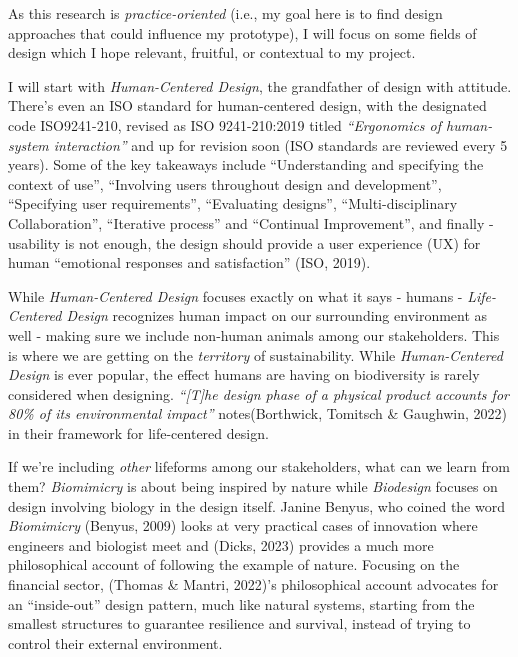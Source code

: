 \documentclass[
  letterpaper,
  DIV=11,
  numbers=noendperiod]{scrartcl}
\begin{document}
As this research is \emph{practice-oriented} (i.e., my goal here is to
find design approaches that could influence my prototype), I will focus
on some fields of design which I hope relevant, fruitful, or contextual
to my project.

I will start with \emph{Human-Centered Design}, the grandfather of
design with attitude. There's even an ISO standard for human-centered
design, with the designated code ISO9241-210, revised as ISO
9241-210:2019 titled \emph{``Ergonomics of human-system interaction''}
and up for revision soon (ISO standards are reviewed every 5 years).
Some of the key takeaways include ``Understanding and specifying the
context of use'', ``Involving users throughout design and development'',
``Specifying user requirements'', ``Evaluating designs'',
``Multi-disciplinary Collaboration'', ``Iterative process'' and
``Continual Improvement'', and finally - usability is not enough, the
design should provide a user experience (UX) for human ``emotional
responses and satisfaction'' (ISO, 2019).

While \emph{Human-Centered Design} focuses exactly on what it says -
humans - \emph{Life-Centered Design} recognizes human impact on our
surrounding environment as well - making sure we include non-human
animals among our stakeholders. This is where we are getting on the
\emph{territory} of sustainability. While \emph{Human-Centered Design}
is ever popular, the effect humans are having on biodiversity is rarely
considered when designing. \emph{``{[}T{]}he design phase of a physical
product accounts for 80\% of its environmental impact''}
notes(Borthwick, Tomitsch \& Gaughwin, 2022) in their framework for
life-centered design.

If we're including \emph{other} lifeforms among our stakeholders, what
can we learn from them? \emph{Biomimicry} is about being inspired by
nature while \emph{Biodesign} focuses on design involving biology in the
design itself. Janine Benyus, who coined the word \emph{Biomimicry}
(Benyus, 2009) looks at very practical cases of innovation where
engineers and biologist meet and (Dicks, 2023) provides a much more
philosophical account of following the example of nature. Focusing on
the financial sector, (Thomas \& Mantri, 2022)'s philosophical account
advocates for an ``inside-out'' design pattern, much like natural
systems, starting from the smallest structures to guarantee resilience
and survival, instead of trying to control their external environment.
\end{document}
